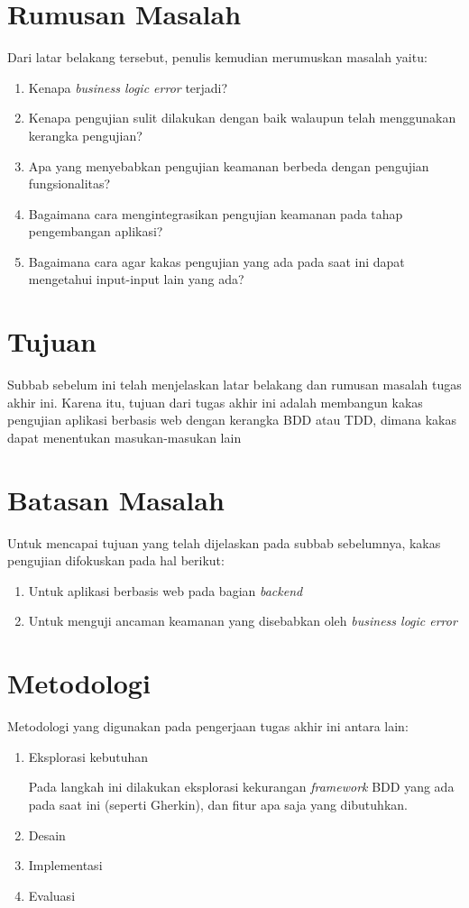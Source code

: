 \section{Rumusan Masalah}

Dari latar belakang tersebut, penulis kemudian merumuskan masalah yaitu:

\begin{enumerate}
    \item Kenapa \textit{business logic error} terjadi?
    \item Kenapa pengujian sulit dilakukan dengan baik walaupun telah menggunakan kerangka pengujian?
    \item Apa yang menyebabkan pengujian keamanan berbeda dengan pengujian fungsionalitas?
    \item Bagaimana cara mengintegrasikan pengujian keamanan pada tahap pengembangan aplikasi?
    \item Bagaimana cara agar kakas pengujian yang ada pada saat ini dapat mengetahui input-input lain yang ada?
\end{enumerate}

\section{Tujuan}

Subbab sebelum ini telah menjelaskan latar belakang dan rumusan masalah tugas akhir ini.
Karena itu, tujuan dari tugas akhir ini adalah membangun kakas pengujian aplikasi berbasis web
dengan kerangka BDD atau TDD, dimana kakas dapat menentukan masukan-masukan lain 

\section{Batasan Masalah}

Untuk mencapai tujuan yang telah dijelaskan pada subbab sebelumnya, kakas pengujian difokuskan pada hal berikut:

\begin{enumerate}
    \item Untuk aplikasi berbasis web pada bagian \textit{backend}
    \item Untuk menguji ancaman keamanan yang disebabkan oleh \textit{business logic error}
\end{enumerate}

\section{Metodologi}

Metodologi yang digunakan pada pengerjaan tugas akhir ini antara lain:

\begin{enumerate}
    \item Eksplorasi kebutuhan

    Pada langkah ini dilakukan eksplorasi kekurangan \textit{framework} BDD yang ada pada saat ini
    (seperti Gherkin), dan fitur apa saja yang dibutuhkan.

    \item Desain 
    \item Implementasi 
    \item Evaluasi
\end{enumerate}